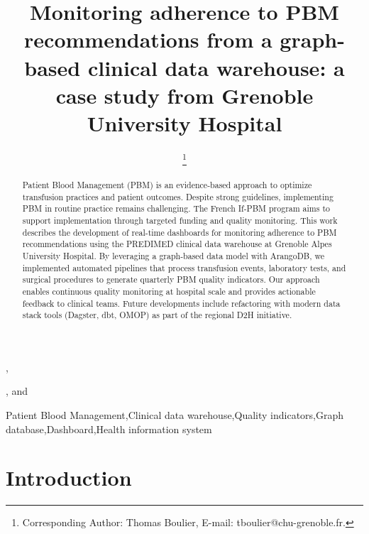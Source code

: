 \documentclass{IOS-Book-Article}
\def\hb{\hbox to 11.5 cm{}}
\begin{document}
\pagestyle{headings}
\def\thepage{}
\begin{frontmatter}

\title{Monitoring adherence to PBM recommendations from a graph-based clinical data warehouse: a case study from Grenoble University Hospital}

\markboth{}{October 2025\hb}

\author[A]{ %
\thanks{Corresponding Author: Thomas Boulier, E-mail: tboulier@chu-grenoble.fr.}}, 
\author[A]{ },
and
\author[A]{ }

\address[A]{Univ. Grenoble Alpes, CNRS, UMR 5525, VetAgro Sup, Grenoble INP, CHU Grenoble Alpes, TIMC, 38000 Grenoble, France}

\begin{abstract}
Patient Blood Management (PBM) is an evidence-based approach to optimize transfusion practices and patient outcomes. Despite strong guidelines, implementing PBM in routine practice remains challenging. The French If-PBM program aims to support implementation through targeted funding and quality monitoring. This work describes the development of real-time dashboards for monitoring adherence to PBM recommendations using the PREDIMED clinical data warehouse at Grenoble Alpes University Hospital. By leveraging a graph-based data model with ArangoDB, we implemented automated pipelines that process transfusion events, laboratory tests, and surgical procedures to generate quarterly PBM quality indicators. Our approach enables continuous quality monitoring at hospital scale and provides actionable feedback to clinical teams. Future developments include refactoring with modern data stack tools (Dagster, dbt, OMOP) as part of the regional D2H initiative.
\end{abstract}

\begin{keyword}
Patient Blood Management\sep Clinical data warehouse\sep Quality indicators\sep Graph database\sep Dashboard\sep Health information system
\end{keyword}
\end{frontmatter}

\markboth{October 2025\hb}{October 2025\hb}

\section{Introduction}
\end{document}
